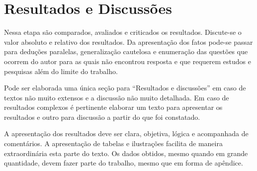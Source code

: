 \chapter{Resultados e Discussões}\label{cap5}

Nessa etapa são comparados, avaliados e criticados os resultados. Discute-se o valor absoluto e relativo dos resultados. Da apresentação dos fatos pode-se passar para deduções paralelas, generalização cautelosa e enumeração das questões que ocorrem do autor para as quais não encontrou resposta e que requerem estudos e pesquisas além do limite do trabalho. 

Pode ser elaborada uma única seção para “Resultados e discussões” em caso de textos não muito extensos e a discussão não muito detalhada. Em caso de resultados complexos é pertinente elaborar um texto para apresentar os resultados e  outro para discussão a partir do que foi constatado.  

A apresentação dos resultados deve ser clara, objetiva, lógica e acompanhada de comentários. A apresentação de tabelas e ilustrações facilita de maneira extraordinária esta parte do texto. Os dados obtidos, mesmo quando em grande quantidade, devem fazer parte do trabalho, mesmo que em forma de apêndice.
